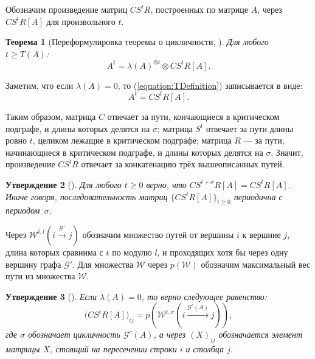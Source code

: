 \documentclass[12pt]{article}
\newtheorem{theorem}{Теорема}[section]
\newtheorem{proposition}[theorem]{Утверждение}
\theoremstyle{definition}
\begin{document}
Обозначим произведение матриц $CS^tR$, построенных по матрице $A$, через $CS^tR[A]$ для произвольного $t$.

\begin{theorem} [{Переформулировка теоремы о цикличности, \cite[теорема 2.2]{15WeakCSRExpantion}}]
\label{theorem:CSRdecompositionTheorem}
Для любого $t \ge T(A)$:
\begin{equation}
\label{equation:TDefinition}
    A^t = \lambda(A)^{\otimes t} \otimes CS^tR[A].
\end{equation}
\end{theorem}

Заметим, что если $\lambda(A) = 0$, то (\ref{equation:TDefinition}) записывается в виде:
\begin{equation*}
    A^t = CS^tR[A].
\end{equation*}

Таким образом, матрица $C$ отвечает за пути, кончающиеся в критическом подграфе, и длины которых делятся на $\sigma$; матрица $S^t$ отвечает за пути длины ровно $t$, целиком лежащие в критическом подграфе; матрица $R$ --- за пути, начинающиеся в критическом подграфе, и длины которых делятся на $\sigma$. Значит, произведение $CS^tR$ отвечает за конкатенацию трёх вышеописанных путей.

\begin{proposition} [{\cite[утверждение 3.2]{21CSRExpansionsOfMatrixPowersInMaxAlgebra}}]
\label{periodicity}
Для любого $t \ge 0$ верно, что 
$CS^{t+\sigma}R[A] = CS^tR[A]$. Иначе говоря, последовательность матриц $\{ CS^tR[A]\}_{t\ge0}$ периодична с периодом~$\sigma$.
\end{proposition}

Через $\mathcal{W}^{t, l}(i \xrightarrow{\mathcal{G}'} j)$ обозначим множество путей от вершины $i$ к вершине $j$, длина которых сравнима с $t$ по модулю $l$, и проходящих хотя бы через одну вершину графа $\mathcal{G}'$. Для множества $\mathcal{W}$ через $p(\mathcal{W})$ обозначим максимальный вес пути из множества $\mathcal{W}$.

\begin{proposition} [{\cite[теорема 6.1]{15WeakCSRExpantion}}]
\label{entriesInCSR}
Если $\lambda(A) = 0$, то верно следующее равенство:
\begin{equation}
    \big(CS^tR[A]\big)_{ij} = p(\mathcal{W}^{t, \sigma}(i \xrightarrow{\mathcal{G}^c(A)} j)),
\end{equation}
где $\sigma$ обозначает цикличность $\mathcal{G}^c(A)$, а через $(X)_{ij}$ обозначается элемент матрицы $X$, стоящий на пересечении строки $i$ и столбца $j$.
\end{proposition}
\end{document}
